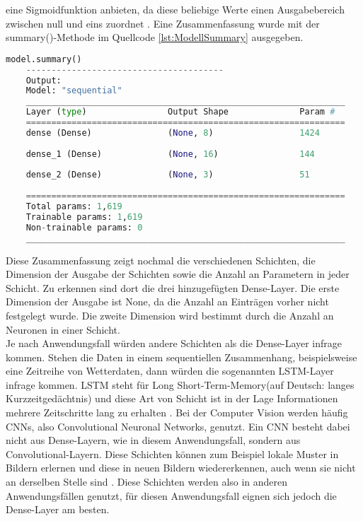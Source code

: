 eine Sigmoidfunktion anbieten, da diese beliebige Werte einen Ausgabebereich zwischen null und eins zuordnet \cite[vgl. S.100]{DL_PY}.
Eine Zusammenfassung wurde mit der summary()-Methode im Quellcode \ref{lst:ModellSummary} ausgegeben.
\begin{lstlisting}[language = python, caption={Zusammenfassung des Modells},captionpos=b, label = lst:ModellSummary, float, floatplacement=H]
    model.summary()
    ---------------------------------------
    Output:
    Model: "sequential"
    _______________________________________________________________
    Layer (type)                Output Shape              Param #   
    ===============================================================
    dense (Dense)               (None, 8)                 1424      
                                                                    
    dense_1 (Dense)             (None, 16)                144       
                                                                    
    dense_2 (Dense)             (None, 3)                 51        
                                                                    
    ===============================================================
    Total params: 1,619
    Trainable params: 1,619
    Non-trainable params: 0
    _______________________________________________________________
\end{lstlisting}
Diese Zusammenfassung zeigt nochmal die verschiedenen Schichten, die Dimension der Ausgabe der Schichten sowie die Anzahl an Parametern in jeder Schicht. 
Zu erkennen sind dort die drei hinzugefügten Dense-Layer. Die erste Dimension der Ausgabe ist \glqq None\grqq{}, da die Anzahl an Einträgen vorher nicht festgelegt wurde. 
Die zweite Dimension wird bestimmt durch die Anzahl an Neuronen in einer Schicht.\\

Je nach Anwendungsfall würden andere Schichten als die Dense-Layer infrage kommen. Stehen die Daten in einem sequentiellen Zusammenhang, beispielsweise eine Zeitreihe von Wetterdaten, dann würden
die sogenannten LSTM-Layer infrage kommen. LSTM steht für Long Short-Term-Memory(auf Deutsch: langes Kurzzeitgedächtnis) und diese Art von Schicht ist in der Lage Informationen mehrere Zeitschritte
lang zu erhalten \cite[vgl. S.260]{DL_PY}. Bei der Computer Vision werden häufig CNNs, also Convolutional Neuronal Networks, genutzt. Ein CNN besteht dabei nicht aus Dense-Layern, wie in diesem 
Anwendungsfall, sondern aus Convolutional-Layern. Diese Schichten können zum Beispiel lokale Muster in Bildern erlernen und diese in neuen Bildern wiedererkennen, auch wenn sie nicht an derselben Stelle
sind \cite[vgl. S.164]{DL_PY}. Diese Schichten werden also in anderen Anwendungsfällen genutzt, für diesen Anwendungsfall eignen sich jedoch die Dense-Layer am besten.    \\

